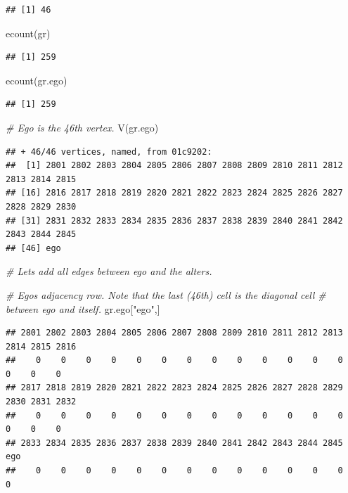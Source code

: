 \documentclass[
]{book}
\newenvironment{Shaded}{\begin{snugshade}}{\end{snugshade}}
\newcommand{\CommentTok}[1]{\textcolor[rgb]{0.56,0.35,0.01}{\textit{#1}}}
\newcommand{\FunctionTok}[1]{\textcolor[rgb]{0.00,0.00,0.00}{#1}}
\newcommand{\NormalTok}[1]{#1}
\newcommand{\StringTok}[1]{\textcolor[rgb]{0.31,0.60,0.02}{#1}}
\begin{document}
\begin{verbatim}
## [1] 46
\end{verbatim}

\begin{Shaded}
\begin{Highlighting}[]
\FunctionTok{ecount}\NormalTok{(gr)}
\end{Highlighting}
\end{Shaded}

\begin{verbatim}
## [1] 259
\end{verbatim}

\begin{Shaded}
\begin{Highlighting}[]
\FunctionTok{ecount}\NormalTok{(gr.ego)}
\end{Highlighting}
\end{Shaded}

\begin{verbatim}
## [1] 259
\end{verbatim}

\begin{Shaded}
\begin{Highlighting}[]
\CommentTok{\# Ego is the 46th vertex.}
\FunctionTok{V}\NormalTok{(gr.ego)}
\end{Highlighting}
\end{Shaded}

\begin{verbatim}
## + 46/46 vertices, named, from 01c9202:
##  [1] 2801 2802 2803 2804 2805 2806 2807 2808 2809 2810 2811 2812 2813 2814 2815
## [16] 2816 2817 2818 2819 2820 2821 2822 2823 2824 2825 2826 2827 2828 2829 2830
## [31] 2831 2832 2833 2834 2835 2836 2837 2838 2839 2840 2841 2842 2843 2844 2845
## [46] ego
\end{verbatim}

\begin{Shaded}
\begin{Highlighting}[]
\CommentTok{\# Let\textquotesingle{}s add all edges between ego and the alters.}

\CommentTok{\# Ego\textquotesingle{}s adjacency row. Note that the last (46th) cell is the diagonal cell}
\CommentTok{\# between ego and itself.}
\NormalTok{gr.ego[}\StringTok{"ego"}\NormalTok{,]}
\end{Highlighting}
\end{Shaded}

\begin{verbatim}
## 2801 2802 2803 2804 2805 2806 2807 2808 2809 2810 2811 2812 2813 2814 2815 2816 
##    0    0    0    0    0    0    0    0    0    0    0    0    0    0    0    0 
## 2817 2818 2819 2820 2821 2822 2823 2824 2825 2826 2827 2828 2829 2830 2831 2832 
##    0    0    0    0    0    0    0    0    0    0    0    0    0    0    0    0 
## 2833 2834 2835 2836 2837 2838 2839 2840 2841 2842 2843 2844 2845  ego 
##    0    0    0    0    0    0    0    0    0    0    0    0    0    0
\end{verbatim}
\end{document}
